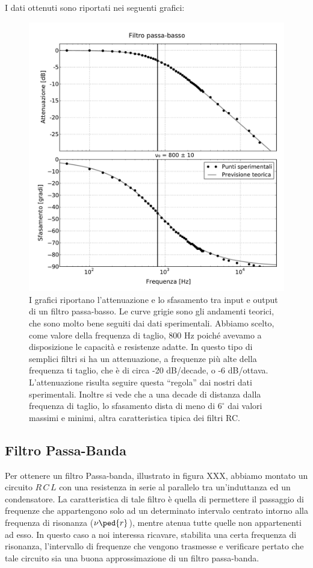 I dati ottenuti sono riportati nei seguenti grafici:

\begin{figure}
  \includegraphics[scale=0.55]{passa_basso.pdf}
  \caption{I grafici riportano l'attenuazione e lo sfasamento tra input e output di un filtro passa-basso.
    Le curve grigie sono gli andamenti teorici, che sono molto bene seguiti dai dati sperimentali. Abbiamo
    scelto, come valore della frequenza di taglio, 800 Hz poiché avevamo a disposizione le capacità
    e resistenze adatte. In questo tipo di semplici filtri si ha un attenuazione, a frequenze più alte della
    frequenza ti taglio, che è di circa -20 dB/decade, o -6 dB/ottava. L'attenuazione risulta seguire questa
    ``regola'' dai nostri dati sperimentali. Inoltre si vede che a una decade di distanza dalla frequenza di taglio,
    lo sfasamento dista di meno di $6^\circ$ dai valori massimi e minimi, altra caratteristica tipica dei filtri RC.}
  \label{fig:g_basso}
\end{figure}

\subsection*{Filtro Passa-Banda}

Per ottenere un filtro Passa-banda, illustrato in figura XXX, abbiamo montato un circuito $R\,C\,L$ con una resistenza in serie al parallelo tra un'induttanza ed un condensatore.
La caratteristica di tale filtro è quella di permettere il passaggio di frequenze che appartengono solo ad un determinato intervalo centrato intorno alla frequenza di risonanza ($\nu\ped{r}$), mentre atenua tutte quelle non appartenenti ad esso.
In questo caso a noi interessa ricavare, stabilita una certa frequenza di risonanza, l'intervallo di frequenze che vengono trasmesse e verificare pertato che tale circuito sia una buona approssimazione di un filtro passa-banda.


